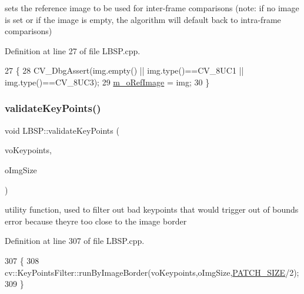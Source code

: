 sets the \textquotesingle{}reference\textquotesingle{} image to be used for inter-\/frame comparisons (note\+: if no image is set or if the image is empty, the algorithm will default back to intra-\/frame comparisons) 



Definition at line 27 of file L\+B\+S\+P.\+cpp.


\begin{DoxyCode}
27                                         \{
28     CV\_DbgAssert(img.empty() || img.type()==CV\_8UC1 || img.type()==CV\_8UC3);
29     \mbox{\hyperlink{class_l_b_s_p_a8c5ccb37124c8fa457db0ba9dbe28c18}{m\_oRefImage}} = img;
30 \}
\end{DoxyCode}
\mbox{\label{class_l_b_s_p_ae5efff966783470187b0a7b7cde63469}} 
\subsubsection{\texorpdfstring{validate\+Key\+Points()}{validateKeyPoints()}}
{\footnotesize\ttfamily void L\+B\+S\+P\+::validate\+Key\+Points (\begin{DoxyParamCaption}\item[{std\+::vector$<$ cv\+::\+Key\+Point $>$ \&}]{vo\+Keypoints,  }\item[{cv\+::\+Size}]{o\+Img\+Size }\end{DoxyParamCaption})\hspace{0.3cm}{\ttfamily [static]}}



utility function, used to filter out bad keypoints that would trigger out of bounds error because they\textquotesingle{}re too close to the image border 



Definition at line 307 of file L\+B\+S\+P.\+cpp.


\begin{DoxyCode}
307                                                                                 \{
308     cv::KeyPointsFilter::runByImageBorder(voKeypoints,oImgSize,\mbox{\hyperlink{class_l_b_s_p_aa98abb79a155d3a2b416c2ab32e74929}{PATCH\_SIZE}}/2);
309 \}
\end{DoxyCode}
\mbox{\label{class_l_b_s_p_ad97557be4bc6cfd7b0fa4b01ab8f8c55}} 
